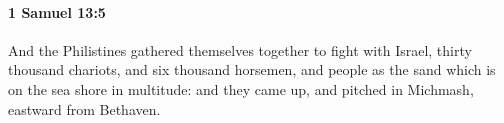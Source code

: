 
		\paragraph{1 Samuel 13:5} %
			\label{1SAMUEL-13-5}

			And the Philistines gathered themselves together to fight with Israel, thirty thousand chariots, and six thousand horsemen, and people as the sand which is on the sea shore in multitude: and they came up, and pitched in Michmash, eastward from Bethaven.


